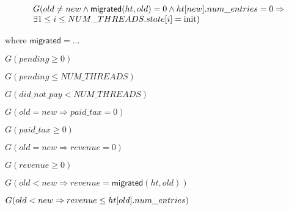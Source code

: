 \begin{lemma} %
  \begin{equation*}
    \begin{array}{l}
      G( old \neq new \wedge \mathsf{migrated}(ht,old) = 0 \wedge \mbox{$ht[new]$}.num\_entries = 0 \Rightarrow \\
      \exists 1 \leq i \leq NUM\_THREADS. state[i] = \mbox{init})
    \end{array}
  \end{equation*}

  where $\mathsf{migrated} = \ldots$
  \label{lemma8b}
\end{lemma}

\begin{lemma} %
  $G(pending \geq 0)$
  \label{pending-pos}
\end{lemma}  

\begin{lemma} %
  $G(pending \leq NUM\_THREADS)$
  \label{pending-upper}
\end{lemma}  

\begin{lemma} %
  $G(did\_not\_pay < NUM\_THREADS)$
    \label{did-not-pay-1}    
\end{lemma}  

\begin{lemma} %
  $G( old = new \Rightarrow paid\_tax = 0)$
  \label{paid-tax-0}    
\end{lemma}  

\begin{lemma} %
  $G(paid\_tax \geq 0)$
    \label{paid-tax-1}  
\end{lemma}

\begin{lemma} %
  $G(old = new \Rightarrow revenue = 0)$
  \label{revenue0}    
\end{lemma}

\begin{lemma} %
  $G( revenue \geq 0)$
  \label{revenue1}    
\end{lemma}

\begin{lemma} %
  $G(old < new \Rightarrow revenue = \mathsf{migrated}(ht,old))$
  \label{revenue2}    
\end{lemma}

\begin{lemma} %
  $G(old < new \Rightarrow revenue \leq \mbox{$ht[old]$}.num\_entries)$
  \label{revenue3}    
\end{lemma}

